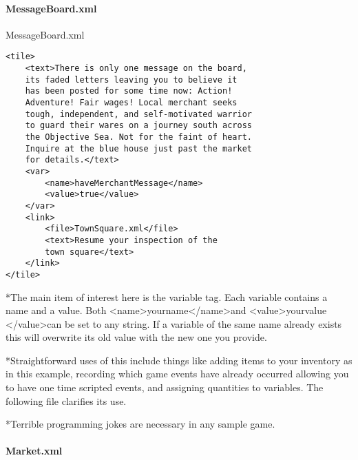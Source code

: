 \documentclass[11pt]{article}
\begin{document}
\paragraph{MessageBoard.xml}

MessageBoard.xml
\begin{lstlisting}[frame=single]
<tile>
	<text>There is only one message on the board, 
	its faded letters leaving you to believe it 
	has been posted for some time now: Action! 
	Adventure! Fair wages! Local merchant seeks 
	tough, independent, and self-motivated warrior 
	to guard their wares on a journey south across 
	the Objective Sea. Not for the faint of heart. 
	Inquire at the blue house just past the market 
	for details.</text>
	<var>
		<name>haveMerchantMessage</name>
		<value>true</value>
	</var> 
	<link>
		<file>TownSquare.xml</file>
		<text>Resume your inspection of the 
		town square</text>
	</link>
</tile>
\end{lstlisting}
*The main item of interest here is the variable tag. Each variable contains a name and a value. Both \textless name\textgreater yourname\textless /name\textgreater  and \textless value\textgreater yourvalue \textless /value\textgreater  can be set to any string. If a variable of the same name already exists this will overwrite its old value with the new one you provide.

*Straightforward uses of this include things like adding items to your inventory as in this example, recording which game events have already occurred allowing you to have one time scripted events, and assigning quantities to variables. The following file clarifies its use.

*Terrible programming jokes are necessary in any sample game.


\paragraph{Market.xml}
\end{document}
